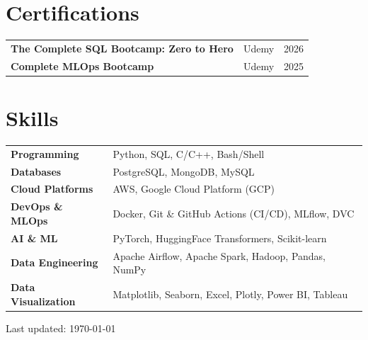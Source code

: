 \documentclass[a4paper,12pt]{article}
\begin{document}
\section{Certifications}
\begin{tabularx}{\linewidth}{@{}l X r@{}}
\textbf{The Complete SQL Bootcamp: Zero to Hero} & \normalsize{Udemy} & \hfill 2026 \\
\textbf{Complete MLOps Bootcamp} & \normalsize{Udemy} & \hfill 2025 \\
\end{tabularx}

\section{Skills}
\begin{tabularx}{\linewidth}{@{}l X@{}}
\textbf{Programming} &  \normalsize{Python, SQL, C/C++, Bash/Shell}\\
\textbf{Databases} &  \normalsize{PostgreSQL, MongoDB, MySQL}\\ 
\textbf{Cloud Platforms} &  \normalsize{AWS, Google Cloud Platform (GCP)}\\
\textbf{DevOps \& MLOps} &  \normalsize{Docker, Git \& GitHub Actions (CI/CD), MLflow, DVC}\\
\textbf{AI \& ML} &  \normalsize{PyTorch, HuggingFace Transformers, Scikit-learn}\\
\textbf{Data Engineering} &  \normalsize{Apache Airflow, Apache Spark, Hadoop, Pandas, NumPy}\\
\textbf{Data Visualization} & \normalsize{Matplotlib, Seaborn, Excel, Plotly, Power BI, Tableau}\\
\end{tabularx}

\vfill
\begin{center}
\footnotesize Last updated: \today
\end{center}
\end{document}
